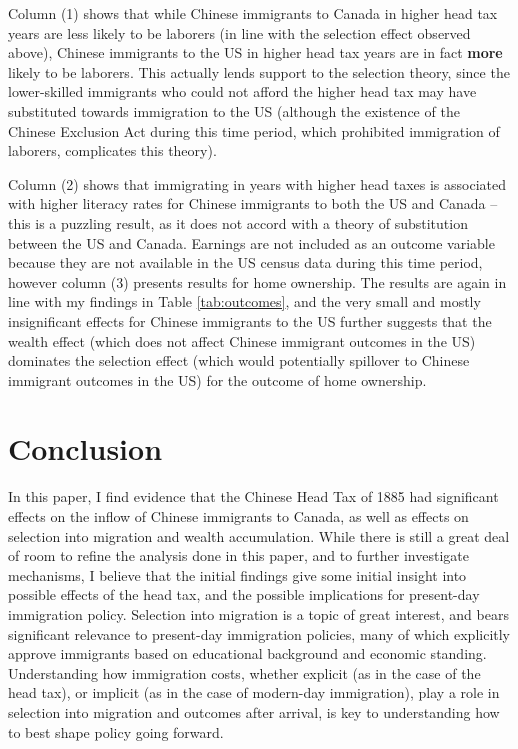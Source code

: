 \documentclass[12pt]{article}
\begin{document}
Column (1) shows that while Chinese immigrants to Canada in higher head tax years are less likely to be laborers (in line with the selection effect observed above), Chinese immigrants to the US in higher head tax years are in fact \textbf{more} likely to be laborers. This actually lends support to the selection theory, since the lower-skilled immigrants who could not afford the higher head tax may have substituted towards immigration to the US (although the existence of the Chinese Exclusion Act during this time period, which prohibited immigration of laborers, complicates this theory). 

Column (2) shows that immigrating in years with higher head taxes is associated with higher literacy rates for Chinese immigrants to both the US and Canada -- this is a puzzling result, as it does not accord with a theory of substitution between the US and Canada. Earnings are not included as an outcome variable because they are not available in the US census data during this time period, however column (3) presents results for home ownership. The results are again in line with my findings in Table \ref{tab:outcomes}, and the very small and mostly insignificant effects for Chinese immigrants to the US further suggests that the wealth effect (which does not affect Chinese immigrant outcomes in the US) dominates the selection effect (which would potentially spillover to Chinese immigrant outcomes in the US) for the outcome of home ownership.

\section{Conclusion}

In this paper, I find evidence that the Chinese Head Tax of 1885 had significant effects on the inflow of Chinese immigrants to Canada, as well as effects on selection into migration and wealth accumulation. While there is still a great deal of room to refine the analysis done in this paper, and to further investigate mechanisms, I believe that the initial findings give some initial insight into possible effects of the head tax, and the possible implications for present-day immigration policy. Selection into migration is a topic of great interest, and bears significant relevance to present-day immigration policies, many of which explicitly approve immigrants based on educational background and economic standing. Understanding how immigration costs, whether explicit (as in the case of the head tax), or implicit (as in the case of modern-day immigration), play a role in selection into migration and outcomes after arrival, is key to understanding how to best shape policy going forward. 
\end{document}
